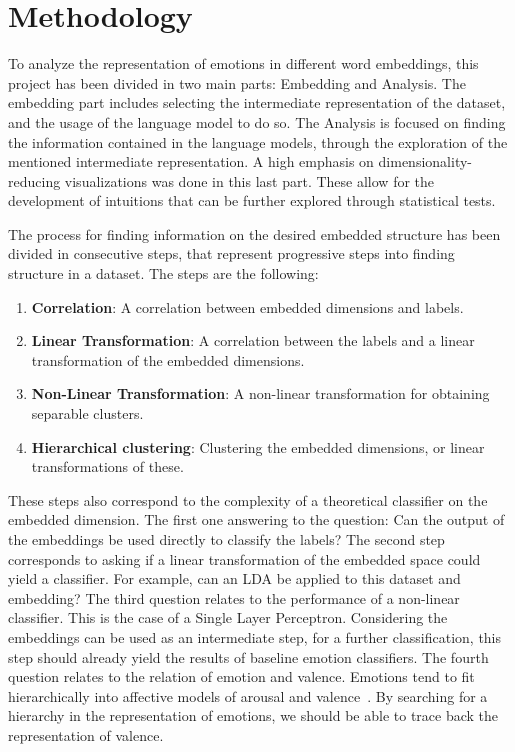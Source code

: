 \chapter{Methodology}\label{chap:Methodology}

To analyze the representation of emotions in different word embeddings, this project has been divided in two main parts: Embedding and Analysis. The embedding part includes selecting the intermediate representation of the dataset, and the usage of the language model to do so. The Analysis is focused on finding the information contained in the language models, through the exploration of the mentioned intermediate representation. A high emphasis on dimensionality-reducing visualizations was done in this last part. These allow for the development of intuitions that can be further explored through statistical tests.

The process for finding information on the desired embedded structure has been divided in consecutive steps, that represent progressive steps into finding structure in a dataset. The steps are the following:

\begin{enumerate}
  \item \textbf{Correlation}: A correlation between embedded dimensions and labels.
  \item \textbf{Linear Transformation}: A correlation between the labels and a linear transformation of the embedded dimensions.
  \item \textbf{Non-Linear Transformation}: A non-linear transformation for obtaining separable clusters.
  \item \textbf{Hierarchical clustering}: Clustering the embedded dimensions, or linear transformations of these.
\end{enumerate}

These steps also correspond to the complexity of a theoretical classifier on the embedded dimension. The first one answering to the question: Can the output of the embeddings be used directly to classify the labels? The second step corresponds to asking if a linear transformation of the embedded space could yield a classifier. For example, can an LDA be applied to this dataset and embedding? The third question relates to the performance of a non-linear classifier. This is the case of a Single Layer Perceptron. Considering the embeddings can be used as an intermediate step, for a further classification, this step should already yield the results of baseline emotion classifiers. The fourth question relates to the relation of emotion and valence. Emotions tend to fit hierarchically into affective models of arousal and valence~\cite{barradas2016thesis}. By searching for a hierarchy in the representation of emotions, we should be able to trace back the representation of valence.


